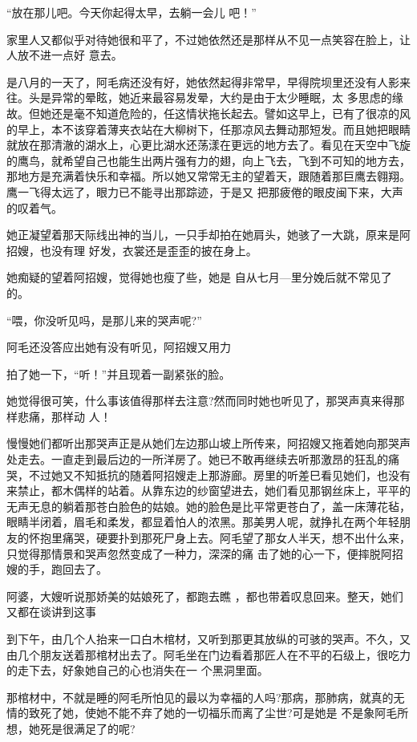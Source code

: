 \documentclass{article}
\begin{document}
“放在那儿吧。今天你起得太早，去躺一会儿
吧！” 

家里人又都似乎对待她很和平了，不过她依然还是那样从不见一点笑容在脸上，让人放不进一点好
意去。 


是八月的一天了，阿毛病还没有好，她依然起得非常早，早得院坝里还没有人影来往。头是异常的晕眩，她近来最容易发晕，大约是由于太少睡眠，太
\newpage
多思虑的缘故。但她还是毫不知道危险的，任这情状拖长起去。譬如这早上，已有了很凉的风的早上，本不该穿着薄夹衣站在大柳树下，任那凉风去舞动那短发。而且她把眼睛就放在那清澈的湖水上，心更比湖水还荡漾在更远的地方去了。看见在天空中飞旋的鹰鸟，就希望自己也能生出两片强有力的翅，向上飞去，飞到不可知的地方去，那地方是充满着快乐和幸福。所以她又常常无主的望着天，跟随着那巨鹰去翱翔。鹰一飞得太远了，眼力已不能寻出那踪迹，于是又
把那疲倦的眼皮闽下来，大声的叹着气。 

她正凝望着那天际线出神的当儿，一只手却拍在她肩头，她骇了一大跳，原来是阿招嫂，也没有理
好发，衣裳还是歪歪的披在身上。 

她痴疑的望着阿招嫂，觉得她也瘦了些，她是
自从七月—里分娩后就不常见了的。 


“喂，你没听见吗，是那儿来的哭声呢?” 

阿毛还没答应出她有没有听见，阿招嫂又用力
\newpage

拍了她一下，“听！”并且现着一副紧张的脸。 

她觉得很可笑，什么事该值得那样去注意?然而同时她也听见了，那哭声真来得那样悲痛，那样动
人！ 

慢慢她们都听出那哭声正是从她们左边那山坡上所传来，阿招嫂又拖着她向那哭声处走去。一直走到最后边的一所洋房了。她已不敢再继续去听那激昂的狂乱的痛哭，不过她又不知抵抗的随着阿招嫂走上那游廊。房里的听差巳看见她们，也没有来禁止，都木偶样的站着。从靠东边的纱窗望进去，她们看见那钢丝床上，平平的无声无息的躺着那苍白脸色的姑娘。她的脸色是比平常更苍白了，盖一床薄花毡，眼睛半闭着，眉毛和柔发，都显着怕人的浓黑。那美男人呢，就挣扎在两个年轻朋友的怀抱里痛哭，硬要扑到那死尸身上去。阿毛望了那女人半天，想不出什么来，只觉得那情景和哭声忽然变成了一种力，深深的痛
击了她的心一下，便摔脱阿招嫂的手，跑回去了。 

阿婆，大嫂听说那娇美的姑娘死了，都跑去瞧
\newpage
，都也带着叹息回来。整天，她们又都在谈讲到这事

到下午，由几个人抬来一口白木棺材，又听到那更其放纵的可骇的哭声。不久，又由几个朋友送着那棺材出去了。阿毛坐在门边看着那匠人在不平的石级上，很吃力的走下去，好象她自己的心也消失在一
个黑洞里面。 

那棺材中，不就是睡的阿毛所怕见的最以为幸福的人吗?那病，那肺病，就真的无情的致死了她，使她不能不弃了她的一切福乐而离了尘世?可是她是
不是象阿毛所想，她死是很满足了的呢? 
\end{document}
